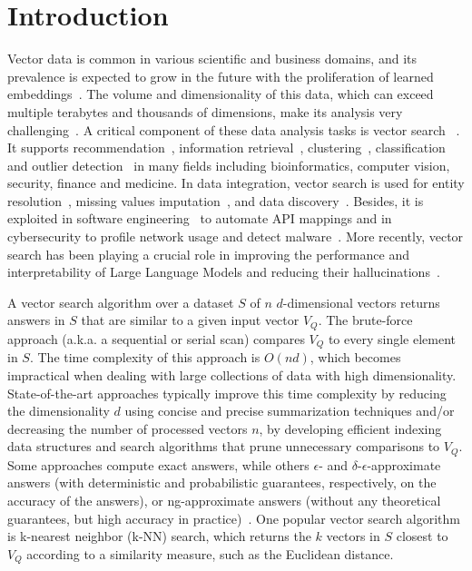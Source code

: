 \section{Introduction}
\label{sec:introduction}
 Vector data is common in various scientific and business domains, and its prevalence is expected to grow in the future with the proliferation of learned embeddings~\cite{conf/icde/echihabi2021,palpanas2015data}. The volume and dimensionality of this data, which can exceed multiple terabytes and thousands of dimensions, make its analysis very challenging~\cite{palpanas2015data}. A critical component of these data analysis tasks is vector search ~\cite{conf/icde/echihabi2021,palpanas2015data,conf/sigmod/echihabi2020,DBLP:conf/wims/EchihabiZP20}. It supports recommendation~\cite{conf/kdd/wang2018,amazon}, information retrieval~\cite{conf/williams2014}, clustering~\cite{journal/JMLR/bubeck2009,journal/pattrecog/Warren2005},
classification~\cite{DBLP:conf/icdm/PetitjeanFWNCK14} and outlier detection~\cite{discord,norma,series2graph,landmines,nba} in many fields including bioinformatics, computer vision, security, finance and medicine. 
In data integration, vector search is used for entity resolution~\cite{journal/pvldb/ebraheem2018}, missing values imputation~\cite{retro}, 
and data discovery~\cite{journal/pvldb/zhu2016}. %
Besides, it is exploited in software engineering~\cite{journal/pacml/uri2019,conf/icsec/nguyen2016} 
to automate API mappings and in cybersecurity to profile network usage and detect malware~\cite{cybersecurity}. More recently, vector search has been playing a crucial role in improving the performance and interpretability of Large Language Models and reducing their hallucinations~\cite{retrieval-diffusion-models,dense-passage-retrieval,seq2seq,rag-nlp}. 

A vector search algorithm over a dataset ${S}$ of $n$ $d$-dimensional vectors returns answers in ${S}$ that are similar to a given input vector $V_Q$. 
The brute-force approach (a.k.a. a sequential or serial scan) compares $V_Q$ to every single element in ${S}$. The time complexity of this approach is $O\left(nd\right)$, which becomes impractical when dealing with large collections of data with high dimensionality. 
State-of-the-art approaches typically improve this time complexity by reducing the dimensionality $d$ using concise and precise summarization techniques and/or decreasing the number of processed vectors $n$, by developing efficient indexing data structures and search algorithms that prune unnecessary comparisons to $V_Q$. 
Some approaches compute exact answers, while others $\epsilon$- and $\delta$-$\epsilon$-approximate answers (with deterministic and probabilistic guarantees, respectively, on the accuracy of the answers), or ng-approximate answers (without any theoretical guarantees, but high accuracy in practice)~\cite{hydra1,lernaeanhydra2}. 
One popular vector search algorithm is k-nearest neighbor (k-NN) search, which returns the $k$ vectors in ${S}$ closest to $V_Q$ according to a similarity measure, such as the Euclidean distance. 

